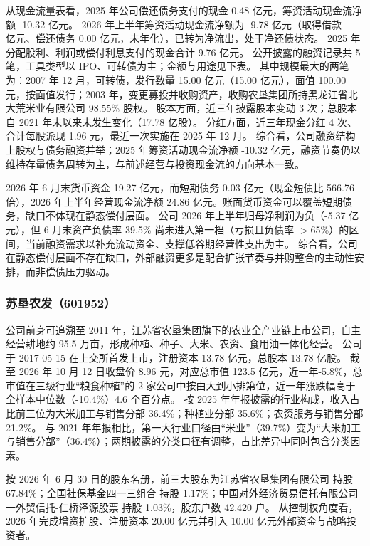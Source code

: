  从现金流量表看，2025 年公司偿还债务支付的现金 0.48 亿元，筹资活动现金流净额 -10.32 亿元。 2026 年上半年筹资活动现金流净额为 -9.78 亿元（取得借款 — 亿元、偿还债务 0.00 亿元，未年化），已转为净流出，处于净还债状态。 2025 年分配股利、利润或偿付利息支付的现金合计 9.76 亿元。 公开披露的融资记录共 5 笔，工具类型以 IPO、可转债为主；金额与用途见下表。 其中规模最大的两笔为：2007 年 12 月，可转债，发行数量 15.00 亿元（15.00 亿元），面值 100.00 元，按面值发行；2003 年，变更募投并收购资产，收购农垦集团所持黑龙江省北大荒米业有限公司 98.55\% 股权。 股本方面，近三年披露股本变动 3 次；总股本自 2021 年末以来未发生变化（17.78 亿股）。 分红方面，近三年现金分红 4 次、合计每股派现 1.96 元，最近一次实施在 2025 年 12 月。 综合看，公司融资结构上股权与债务融资并举；2025 年筹资活动现金流净额 -10.32 亿元，融资节奏仍以维持存量债务周转为主，与前述经营与投资现金流的方向基本一致。

 2026 年 6 月末货币资金 19.27 亿元，而短期债务 0.03 亿元（现金短债比 566.76 倍），2026 年上半年经营现金流净额 24.86 亿元。账面货币资金可以覆盖短期债务，缺口不体现在静态偿付层面。 公司 2026 年上半年归母净利润为负（-5.37 亿元），但 6 月末资产负债率 39.5\% 尚未进入第一档（亏损且负债率 $>$65\%）的区间，当前融资需求以补充流动资金、支撑低谷期经营性支出为主。 综合看，公司在静态偿付层面不存在缺口，外部融资更多是配合扩张节奏与并购整合的主动性安排，而非偿债压力驱动。




\subsubsection{苏垦农发（601952）}
\label{co:601952}

 公司前身可追溯至 2011 年，江苏省农垦集团旗下的农业全产业链上市公司，自主经营耕地约 95.5 万亩，形成种植、种子、大米、农资、食用油一体化经营。 公司于 2017-05-15 在上交所首发上市，注册资本 13.78 亿元，总股本 13.78 亿股。 截至 2026 年 10 月 12 日收盘价 8.96 元，对应总市值 123.5 亿元，近一年-5.8\%，总市值在三级行业“粮食种植”的 2 家公司中按由大到小排第位，近一年涨跌幅高于全样本中位数（-10.4\%）4.6 个百分点。 按 2025 年年报披露的行业构成，收入占比前三位为大米加工与销售分部 36.4\%；种植业分部 35.6\%；农资服务与销售分部 21.2\%。 与 2021 年年报相比，第一大行业口径由“米业”（39.7\%）变为“大米加工与销售分部”（36.4\%）；两期披露的分类口径有调整，占比差异中同时包含分类因素。

 按 2026 年 6 月 30 日的股东名册，前三大股东为江苏省农垦集团有限公司 持股 67.84\%；全国社保基金四一三组合 持股 1.17\%；中国对外经济贸易信托有限公司一外贸信托-仁桥泽源股票 持股 1.03\%，股东户数 42,420 户。 从控制权角度看，2026 年完成增资扩股、注册资本 20.00 亿元并引入 10.00 亿元外部资金与战略投资者。

